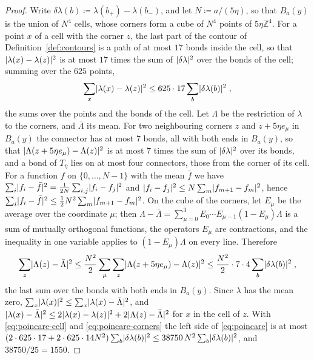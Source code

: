 \documentclass[11pt]{preprint}
\DeclarePairedDelimiter{\abs}{\lvert}{\rvert}
\numberwithin{equation}{section}
\theoremstyle{definition}
\theoremstyle{remark}
\theoremstyle{plain}
\begin{document}
\begin{proof}
Write $\delta\lambda(b) \coloneqq \lambda(b_+) - \lambda(b_-)$, and let $N \coloneqq a/(5\eta)$, so that $B_a(y)$ is the union of $N^4$ cells, whose corners form a cube of $N^4$ points of $5\eta\mathbb Z^4$. For a point $x$ of a cell with the corner $z$, the last part of the contour of Definition~\ref{def:contours} is a path of at most $17$ bonds inside the cell, so that $\abs{\lambda(x) - \lambda(z)}^2$ is at most $17$ times the sum of $\abs{\delta\lambda}^2$ over the bonds of the cell; summing over the $625$ points,
\begin{equation}\label{eq:poincare-cell}
    \sum_{x}\abs{\lambda(x) - \lambda(z)}^2 \leq 625 \cdot 17\sum_{b}\abs{\delta\lambda(b)}^2\;,
\end{equation}
the sums over the points and the bonds of the cell. Let $\Lambda$ be the restriction of $\lambda$ to the corners, and $\bar\Lambda$ its mean. For two neighbouring corners $z$ and $z + 5\eta e_\mu$ in $B_a(y)$ the connector has at most $7$ bonds, all with both ends in $B_a(y)$, so that $\abs{\Lambda(z + 5\eta e_\mu) - \Lambda(z)}^2$ is at most $7$ times the sum of $\abs{\delta\lambda}^2$ over its bonds, and a bond of $T_\eta$ lies on at most four connectors, those from the corner of its cell. For a function $f$ on $\{ 0, \dots, N - 1 \}$ with the mean $\bar f$ we have $\sum_i\abs{f_i - \bar f}^2 = \frac{1}{2N}\sum_{i,j}\abs{f_i - f_j}^2$ and $\abs{f_i - f_j}^2 \leq N\sum_m\abs{f_{m+1} - f_m}^2$, hence $\sum_i\abs{f_i - \bar f}^2 \leq \frac12N^2\sum_m\abs{f_{m+1} - f_m}^2$. On the cube of the corners, let $E_\mu$ be the average over the coordinate $\mu$; then $\Lambda - \bar\Lambda = \sum_{\mu=0}^{3}E_0\cdots E_{\mu-1}(1 - E_\mu)\Lambda$ is a sum of mutually orthogonal functions, the operators $E_\mu$ are contractions, and the inequality in one variable applies to $(1 - E_\mu)\Lambda$ on every line. Therefore
\begin{equation}\label{eq:poincare-corners}
    \sum_z\abs{\Lambda(z) - \bar\Lambda}^2 \leq \frac{N^2}{2}\sum_\mu\sum_z\abs{\Lambda(z + 5\eta e_\mu) - \Lambda(z)}^2 \leq \frac{N^2}{2} \cdot 7 \cdot 4\sum_b\abs{\delta\lambda(b)}^2\;,
\end{equation}
the last sum over the bonds with both ends in $B_a(y)$. Since $\lambda$ has the mean zero, $\sum_x\abs{\lambda(x)}^2 \leq \sum_x\abs{\lambda(x) - \bar\Lambda}^2$, and $\abs{\lambda(x) - \bar\Lambda}^2 \leq 2\abs{\lambda(x) - \lambda(z)}^2 + 2\abs{\Lambda(z) - \bar\Lambda}^2$ for $x$ in the cell of $z$. With \eqref{eq:poincare-cell} and \eqref{eq:poincare-corners} the left side of \eqref{eq:poincare} is at most $(2 \cdot 625 \cdot 17 + 2 \cdot 625 \cdot 14N^2)\sum_b\abs{\delta\lambda(b)}^2 \leq 38750\,N^2\sum_b\abs{\delta\lambda(b)}^2$, and $38750/25 = 1550$.
\end{proof}
\end{document}

